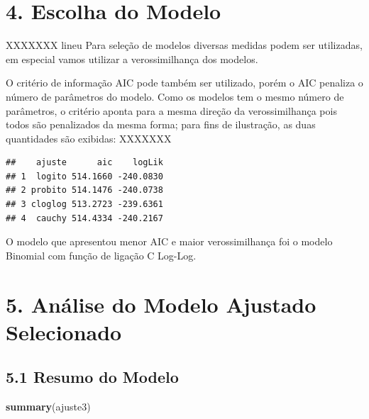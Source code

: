 \documentclass[]{article}
\newenvironment{Shaded}{\begin{snugshade}}{\end{snugshade}}
\newcommand{\KeywordTok}[1]{\textcolor[rgb]{0.13,0.29,0.53}{\textbf{{#1}}}}
\newcommand{\NormalTok}[1]{{#1}}
\begin{document}
\section{4. Escolha do Modelo}\label{escolha-do-modelo}

XXXXXXX lineu Para seleção de modelos diversas medidas podem ser
utilizadas, em especial vamos utilizar a verossimilhança dos modelos.

O critério de informação AIC pode também ser utilizado, porém o AIC
penaliza o número de parâmetros do modelo. Como os modelos tem o mesmo
número de parâmetros, o critério aponta para a mesma direção da
verossimilhança pois todos são penalizados da mesma forma; para fins de
ilustração, as duas quantidades são exibidas: XXXXXXX

\begin{verbatim}
##    ajuste      aic    logLik
## 1  logito 514.1660 -240.0830
## 2 probito 514.1476 -240.0738
## 3 cloglog 513.2723 -239.6361
## 4  cauchy 514.4334 -240.2167
\end{verbatim}

O modelo que apresentou menor AIC e maior verossimilhança foi o modelo
Binomial com função de ligação C Log-Log.

\section{5. Análise do Modelo Ajustado
Selecionado}\label{analise-do-modelo-ajustado-selecionado}

\subsection{\texorpdfstring{\textbf{5.1 Resumo do
Modelo}}{5.1 Resumo do Modelo}}\label{resumo-do-modelo}

\begin{Shaded}
\begin{Highlighting}[]
\KeywordTok{summary}\NormalTok{(ajuste3) }
\end{Highlighting}
\end{Shaded}
\end{document}
